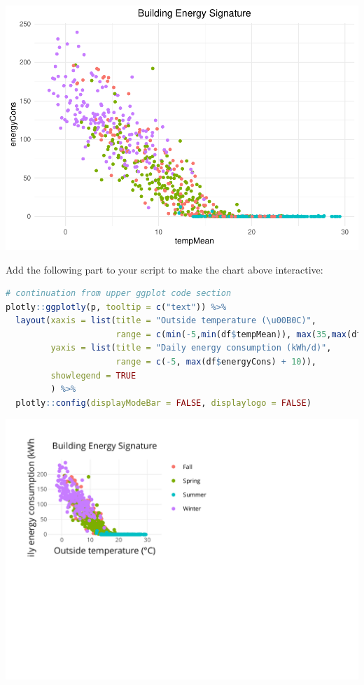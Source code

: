\documentclass[
]{book}
\begin{document}
\includegraphics{edar_files/figure-latex/energysignature ggplot-1.pdf}

Add the following part to your script to make the chart above interactive:

\begin{lstlisting}[language=R]
# continuation from upper ggplot code section
plotly::ggplotly(p, tooltip = c("text")) %>%
  layout(xaxis = list(title = "Outside temperature (\u00B0C)",
                      range = c(min(-5,min(df$tempMean)), max(35,max(df$tempMean))), zeroline = F),
         yaxis = list(title = "Daily energy consumption (kWh/d)",
                      range = c(-5, max(df$energyCons) + 10)),
         showlegend = TRUE
         ) %>%
  plotly::config(displayModeBar = FALSE, displaylogo = FALSE)
\end{lstlisting}

\includegraphics{edar_files/figure-latex/energysignature plotly-1.pdf}
\end{document}
